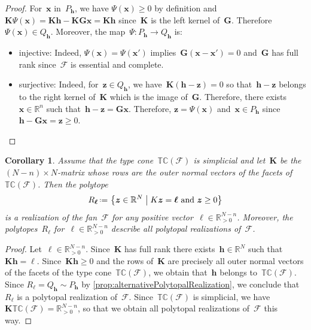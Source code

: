 \documentclass{amsart}
\newtheorem{corollary}[theorem]{Corollary}
\theoremstyle{definition}
\newcommand{\R}{\mathbb{R}} %
\renewcommand{\b}[1]{{\boldsymbol{#1}}} %
\newcommand{\set}[2]{\left\{ #1 \;\middle|\; #2 \right\}} %
\newcommand{\eqdef}{\mbox{\,\raisebox{0.2ex}{\scriptsize\ensuremath{\mathrm:}}\ensuremath{=}\,}} %
\newcommand{\Fan}{\mathcal{F}} %
\newcommand{\typeCone}{\mathbb{TC}} %
\begin{document}
\begin{proof}
For~$\b{x}$ in~$P_\b{h}$, we have $\Psi(\b{x}) \ge 0$ by definition and~$\b{K}\Psi(\b{x}) = \b{K}\b{h} - \b{K}\b{G}\b{x} = \b{K}\b{h}$ since~$\b{K}$ is the left kernel of~$\b{G}$. Therefore~$\Psi(\b{x}) \in Q_\b{h}$.
Moreover, the map~$\Psi : P_\b{h} \to Q_\b{h}$ is:
\begin{itemize}
\item injective: Indeed, $\Psi(\b{x}) = \Psi(\b{x}')$ implies~$\b{G}(\b{x} - \b{x}') = 0$ and~$\b{G}$ has full rank since~$\Fan$ is essential and complete.
\item surjective: Indeed, for~$\b{z} \in Q_\b{h}$, we have~$\b{K}(\b{h}-\b{z}) = 0$ so that~$\b{h}-\b{z}$ belongs to the right kernel of~$\b{K}$ which is the image of~$\b{G}$. Therefore, there exists~$\b{x} \in \R^n$ such that~$\b{h}-\b{z} = \b{G}\b{x}$. Therefore, $\b{z} = \Psi(\b{x})$ and~$\b{x} \in P_\b{h}$ since~$\b{h} - \b{G}\b{x} = \b{z} \ge 0$.\qedhere
\end{itemize}
\end{proof}

\begin{corollary}
\label{coro:simplicialTypeCone}
Assume that the type cone~$\typeCone(\Fan)$ is simplicial and let~$\b{K}$ be the $(N-n) \times N$-matrix whose rows are the outer normal vectors of the facets of~$\typeCone(\Fan)$. Then the polytope
\[
R_\b{\ell} \eqdef \set{\b{z} \in \R^N}{K\b{z} = \b{\ell} \text{ and } \b{z} \ge 0}
\]
is a realization of the fan~$\Fan$ for any positive vector~$\b{\ell} \in \R_{>0}^{N-n}$.
Moreover, the polytopes~$R_\b{\ell}$ for~$\b{\ell} \in \R_{>0}^{N-n}$ describe all polytopal realizations of~$\Fan$.
\end{corollary}

\begin{proof}
Let~$\b{\ell} \in \R_{>0}^{N-n}$.
Since~$\b{K}$ has full rank there exists~$\b{h} \in \R^N$ such that~$\b{K}\b{h} = \b{\ell}$.
Since~$\b{K}\b{h} \ge 0$ and the rows of~$\b{K}$ are precisely all outer normal vectors of the facets of the type cone~$\typeCone(\Fan)$, we obtain that~$\b{h}$ belongs to~$\typeCone(\Fan)$.
Since $R_\b{\ell} = Q_\b{h} \sim P_\b{h}$ by \cref{prop:alternativePolytopalRealization}, we conclude that~$R_\b{\ell}$ is a polytopal realization of~$\Fan$.
Since~$\typeCone(\Fan)$ is simplicial, we have~$\b{K}\typeCone(\Fan) = \R_{>0}^{N-n}$, so that we obtain all polytopal realizations of~$\Fan$ this way.
\end{proof}

\end{document}
